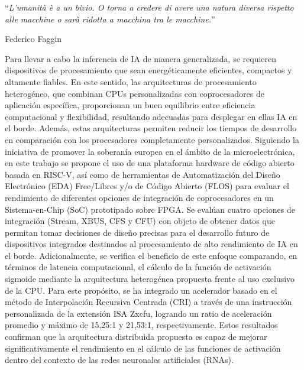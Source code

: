 \documentclass[
11pt, %
spanish, %
singlespacing, %
headsepline, %
]{MastersDoctoralThesis} %
\begin{document}

\vspace*{0.2\textheight}

\noindent\enquote{\itshape L'umanità è a un bivio. O torna a credere di avere una natura diversa rispetto alle macchine o sarà ridotta a macchina tra le macchine.}\bigbreak

\hfill Federico Faggin


\begin{Resumen}
\addchaptertocentry{\resumenname} %
Para llevar a cabo la inferencia de IA de manera generalizada, se requieren dispositivos de procesamiento que sean energéticamente eficientes, compactos y altamente fiables. 
En este sentido, las arquitecturas de procesamiento heterogéneo, que combinan CPUs personalizadas con coprocesadores de aplicación específica, proporcionan un buen equilibrio entre eficiencia computacional y flexibilidad, resultando adecuadas para desplegar en ellas IA en el borde. 
Además, estas arquitecturas permiten reducir los tiempos de desarrollo en comparación con los procesadores completamente personalizados.
Siguiendo la iniciativa de promover la soberanía europea en el ámbito de la microelectrónica, en este trabajo se propone el uso de una plataforma hardware de código abierto basada en RISC-V, así como de herramientas de Automatización del Diseño Electrónico (EDA) Free/Libres y/o de Código Abierto (FLOS) para evaluar el rendimiento de diferentes opciones de integración de coprocesadores en un Sistema-en-Chip (SoC) prototipado sobre FPGA. 
Se evalúan cuatro opciones de integración (Stream, XBUS, CFS y CFU) con objeto de obtener datos que permitan tomar decisiones de diseño precisas para el desarrollo futuro de dispositivos integrados destinados al procesamiento de alto rendimiento de IA en el borde.
Adicionalmente, se verifica el beneficio de este enfoque comparando, en términos de latencia computacional, el cálculo de la función de activación sigmoide mediante la arquitectura heterogénea propuesta frente al uso exclusivo de la CPU.
Para este propósito, se ha integrado un acelerador basado en el método de Interpolación Recursiva Centrada (CRI) a través de una instrucción personalizada de la extensión ISA Zxcfu, logrando un ratio de aceleración promedio y máximo de 15,25:1 y 21,53:1, respectivamente. 
Estos resultados confirman que la arquitectura distribuida propuesta es capaz de mejorar significativamente el rendimiento en el cálculo de las funciones de activación dentro del contexto de las redes neuronales artificiales (RNAs).
\vspace{2cm}
\end{Resumen}
\end{document}
